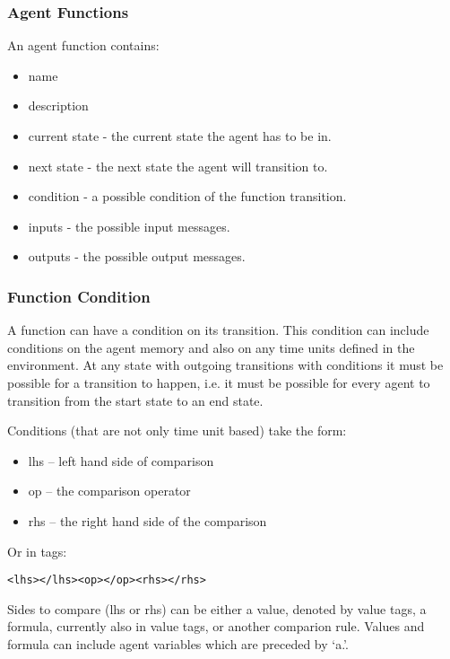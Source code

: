 \subsubsection{Agent Functions}

An agent function contains:

\begin{itemize}
\item name
\item description
\item current state - the current state the agent has to be in.
\item next state - the next state the agent will transition to.
\item condition - a possible condition of the function transition.
\item inputs - the possible input messages.
\item outputs - the possible output messages.
\end{itemize}

\subsubsection{Function Condition}
\label{functioncond}

A function can have a condition on its transition. This condition can include
conditions on the agent memory and also on any time units defined in the
environment. At any state with outgoing transitions with conditions it must be
possible for a transition to happen, i.e. it must be possible for every agent
to transition from the start state to an end state.

Conditions (that are not only time unit based) take the form:

\begin{itemize}
  \item lhs -- left hand side of comparison
  \item op -- the comparison operator
  \item rhs -- the right hand side of the comparison
\end{itemize}

Or in tags:

\begin{mylisting}
\begin{verbatim}
<lhs></lhs><op></op><rhs></rhs>
\end{verbatim}
\end{mylisting}

Sides to compare (lhs or rhs) can be either a value, denoted by value tags, 
a formula, currently also in value tags, or another comparion rule.
Values and formula can include agent variables which are preceded by `a.'.

